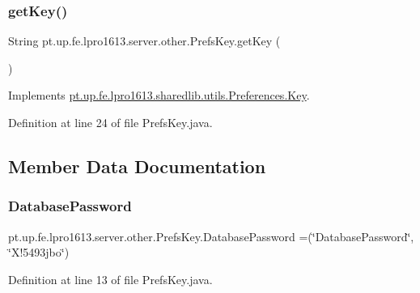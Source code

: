 \subsubsection{\texorpdfstring{get\+Key()}{getKey()}}
{\footnotesize\ttfamily String pt.\+up.\+fe.\+lpro1613.\+server.\+other.\+Prefs\+Key.\+get\+Key (\begin{DoxyParamCaption}{ }\end{DoxyParamCaption})}



Implements \hyperlink{interfacept_1_1up_1_1fe_1_1lpro1613_1_1sharedlib_1_1utils_1_1_preferences_1_1_key_af244cecb8edad1f87eaaa517c3590507}{pt.\+up.\+fe.\+lpro1613.\+sharedlib.\+utils.\+Preferences.\+Key}.



Definition at line 24 of file Prefs\+Key.\+java.



\subsection{Member Data Documentation}
\hypertarget{enumpt_1_1up_1_1fe_1_1lpro1613_1_1server_1_1other_1_1_prefs_key_a47cf4dbfe663d670dceb3ca51b4e4f79}{}\label{enumpt_1_1up_1_1fe_1_1lpro1613_1_1server_1_1other_1_1_prefs_key_a47cf4dbfe663d670dceb3ca51b4e4f79} 
\subsubsection{\texorpdfstring{Database\+Password}{DatabasePassword}}
{\footnotesize\ttfamily pt.\+up.\+fe.\+lpro1613.\+server.\+other.\+Prefs\+Key.\+Database\+Password =(\char`\"{}Database\+Password\char`\"{}, \char`\"{}X!5493jbo\char`\"{})}



Definition at line 13 of file Prefs\+Key.\+java.

\hypertarget{enumpt_1_1up_1_1fe_1_1lpro1613_1_1server_1_1other_1_1_prefs_key_a2805e6e6a98551242a1f0d86fc55a156}{}\label{enumpt_1_1up_1_1fe_1_1lpro1613_1_1server_1_1other_1_1_prefs_key_a2805e6e6a98551242a1f0d86fc55a156} 
